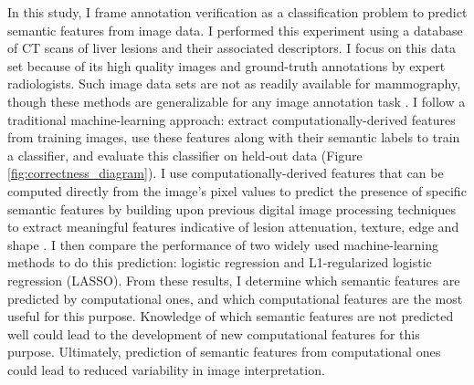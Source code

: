 In this study, I frame annotation verification as a classification problem to predict semantic features from image data.
I performed this experiment using a database of CT scans of liver lesions and their associated descriptors.
I focus on this data set because of its high quality images and ground-truth annotations by expert radiologists.
Such image data sets are not as readily available for mammography, though these methods are generalizable for any image annotation task \cite{Deselaers:2008gk}.
I follow a traditional machine-learning approach: extract computationally-derived features from training images, use these features along with their semantic labels to train a classifier, and evaluate this classifier on held-out data (Figure \ref{fig:correctness_diagram}). 
I use computationally-derived features that can be computed directly from the image's pixel values to predict the presence of specific semantic features by building upon previous digital image processing techniques to extract meaningful features indicative of lesion attenuation, texture, edge and shape \cite{Strela:2002vq,Zhao:2005wb,Hong:2006ti,Manay:2006un,MRangayyan:2005td,Xu:2012bh}.
I then compare the performance of two widely used machine-learning methods to do this prediction: logistic regression and L1-regularized logistic regression (LASSO).
From these results, I determine which semantic features are predicted by computational ones, and which computational features are the most useful for this purpose.
Knowledge of which semantic features are not predicted well could lead to the development of new computational features for this purpose.
Ultimately, prediction of semantic features from computational ones could lead to reduced variability in image interpretation.




